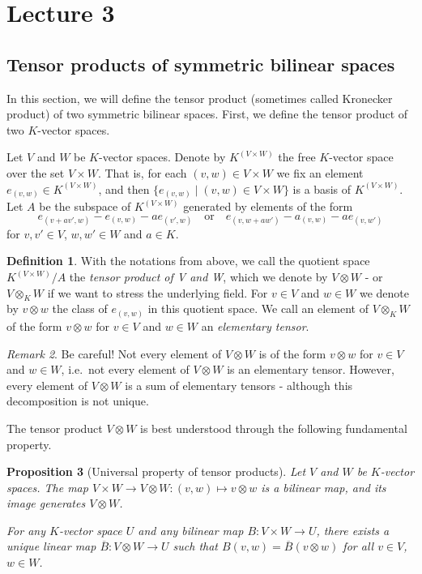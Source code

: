 \documentclass[12pt, leqno, british]{amsart}
\theoremstyle{definition}
\newtheorem{defi}{Definition}[subsection]
\theoremstyle{plain}
\newtheorem{prop}[defi]{Proposition}
\theoremstyle{remark}
\newtheorem{rem}[defi]{Remark}
\newcommand{\ovl}{\overline}
\begin{document}
\section{Lecture 3}
\subsection{Tensor products of symmetric bilinear spaces}
In this section, we will define the tensor product (sometimes called Kronecker product) of two symmetric bilinear spaces.
First, we define the tensor product of two $K$-vector spaces.

Let $V$ and $W$ be $K$-vector spaces.
Denote by $K^{(V \times W)}$ the free $K$-vector space over the set $V \times W$.
That is, for each $(v, w) \in V \times W$ we fix an element $e_{(v, w)} \in K^{(V \times W)}$, and then $\lbrace e_{(v, w)} \mid (v, w) \in V \times W \rbrace$ is a basis of $K^{(V \times W)}$.
Let $A$ be the subspace of $K^{(V \times W)}$ generated by elements of the form
\begin{displaymath}
e_{(v+av', w)} - e_{(v, w)} - ae_{(v', w)} \quad\text{or}\quad e_{(v,w+aw')} - a_{(v, w)} - ae_{(v, w')}
\end{displaymath}
for $v, v' \in V$, $w, w' \in W$ and $a \in K$.
\begin{defi}
With the notations from above, we call the quotient space $K^{(V \times W)}/A$ the \emph{tensor product of V and W}, which we denote by $V \otimes W$ - or $V \otimes_K W$ if we want to stress the underlying field.
For $v \in V$ and $w \in W$ we denote by $v \otimes w$ the class of $e_{(v, w)}$ in this quotient space.
We call an element of $V \otimes_K W$ of the form $v \otimes w$ for $v \in V$ and $w \in W$ an \emph{elementary tensor}.
\end{defi}
\begin{rem}
Be careful! Not every element of $V \otimes W$ is of the form $v \otimes w$ for $v \in V$ and $w \in W$, i.e.~not every element of $V \otimes W$ is an elementary tensor.
However, every element of $V \otimes W$ is a sum of elementary tensors - although this decomposition is not unique.
\end{rem}
The tensor product $V \otimes W$ is best understood through the following fundamental property.
\begin{prop}[Universal property of tensor products]\label{P:tensor-product-universal-property}
Let $V$ and $W$ be $K$-vector spaces.
The map $V \times W \to V \otimes W : (v, w) \mapsto v \otimes w$ is a bilinear map, and its image generates $V \otimes W$.

For any $K$-vector space $U$ and any bilinear map $B : V \times W \to U$,
there exists a unique linear map $\ovl{B} : V \otimes W \to U$ such that $B(v, w) = \ovl{B}(v \otimes w)$ for all $v \in V$, $w \in W$.
\end{prop}
\end{document}
